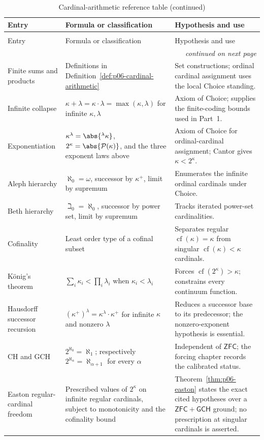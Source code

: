 \begingroup\small
\begin{longtable}{@{}p{}p{}p{}@{}}
\caption{Cardinal-arithmetic reference table.}
\label{tab:p06-cardinal-arithmetic}\\
\toprule
Entry & Formula or classification & Hypothesis and use \\
\midrule
\endfirsthead
\caption[]{Cardinal-arithmetic reference table (continued)}\\
\toprule
Entry & Formula or classification & Hypothesis and use \\
\midrule
\endhead
\midrule\multicolumn{3}{r}{\emph{continued on next page}}\\
\endfoot
\endlastfoot
Finite sums and products & Definitions in
Definition~\ref{def:p06-cardinal-arithmetic} & Set constructions; ordinal
cardinal assignment uses the local Choice standing. \\
Infinite collapse & \(\kappa+\lambda=\kappa\cdot\lambda=
\max(\kappa,\lambda)\) for infinite \(\kappa,\lambda\) & Axiom of Choice;
supplies the finite-coding bounds used in Part~1. \\
Exponentiation & \(\kappa^\lambda=\abs{{}^{\lambda}\kappa}\),
\(2^\kappa=\abs{\mathcal P(\kappa)}\), and the three exponent laws above & Axiom
of Choice for ordinal-cardinal assignment; Cantor gives
\(\kappa<2^\kappa\). \\
Aleph hierarchy & \(\aleph_0=\omega\), successor by \(\kappa^+\), limit by
supremum & Enumerates the infinite ordinal cardinals under Choice. \\
Beth hierarchy & \(\beth_0=\aleph_0\), successor by power set, limit by
supremum & Tracks iterated power-set cardinalities. \\
Cofinality & Least order type of a cofinal subset & Separates regular
\(\operatorname{cf}(\kappa)=\kappa\) from singular
\(\operatorname{cf}(\kappa)<\kappa\) cardinals. \\
K\"onig's theorem & \(\sum_i\kappa_i<\prod_i\lambda_i\) when
\(\kappa_i<\lambda_i\) & Forces
\(\operatorname{cf}(2^\kappa)>\kappa\); constrains every continuum function. \\
Hausdorff successor recursion &
\((\kappa^+)^\lambda=\kappa^\lambda\cdot\kappa^+\) for infinite
\(\kappa\) and nonzero \(\lambda\) & Reduces a successor base to its
predecessor; the nonzero-exponent hypothesis is essential. \\
CH and GCH & \(2^{\aleph_0}=\aleph_1\); respectively
\(2^{\aleph_\alpha}=\aleph_{\alpha+1}\) for every \(\alpha\) & Independent
of \(\mathsf{ZFC}\); the forcing chapter records the calibrated status. \\
Easton regular-cardinal freedom & Prescribed values of \(2^\kappa\) on
infinite regular cardinals, subject to monotonicity and the cofinality bound &
Theorem~\ref{thm:p06-easton} states the exact cited hypotheses over a
\(\mathsf{ZFC}+\mathsf{GCH}\) ground; no prescription at singular cardinals is
asserted. \\
\bottomrule
\end{longtable}
\endgroup

